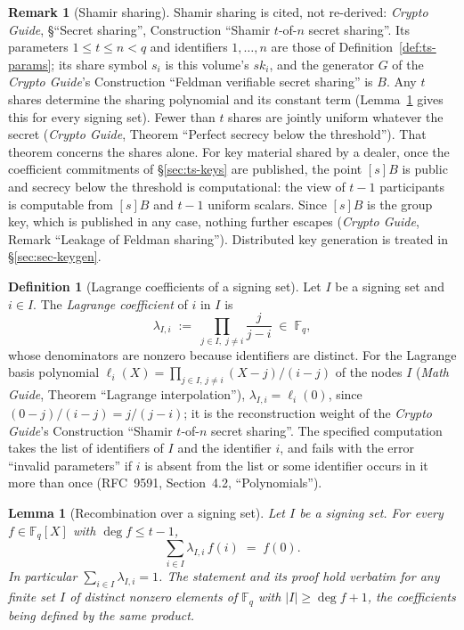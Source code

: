 \documentclass[11pt,a4paper]{article}
\newtheorem{lemma}[theorem]{Lemma}
\theoremstyle{definition}
\newtheorem{definition}[theorem]{Definition}
\newtheorem{remark}[theorem]{Remark}
\newcommand{\F}{\mathbb{F}}
\newcommand{\Fq}{\F_q}
\begin{document}
\begin{remark}[Shamir sharing]
Shamir sharing is cited, not re-derived: \emph{Crypto Guide},
\S``Secret sharing'', Construction ``Shamir \(t\)-of-\(n\) secret sharing''.
Its parameters \(1 \le t \le n < q\) and identifiers \(1, \dots, n\) are
those of Definition~\ref{def:ts-params}; its share symbol \(s_i\) is this
volume's \(\mathit{sk}_i\), and the generator \(G\) of the \emph{Crypto
Guide}'s Construction ``Feldman verifiable secret sharing'' is \(B\). Any \(t\)
shares determine the sharing polynomial and its constant term
(Lemma~\ref{lem:recombine} gives this for every signing set). Fewer than
\(t\) shares are jointly uniform whatever the secret (\emph{Crypto Guide},
Theorem ``Perfect secrecy below the threshold''). That theorem concerns the
shares alone. For key material shared by a dealer, once the coefficient
commitments of \S\ref{sec:ts-keys} are published, the point \([s]B\) is public
and secrecy below the threshold is computational: the view of \(t - 1\)
participants is computable from \([s]B\) and \(t - 1\) uniform scalars. Since
\([s]B\) is the group key, which is published in any case, nothing further
escapes (\emph{Crypto Guide}, Remark ``Leakage of Feldman sharing'').
Distributed key generation is treated in \S\ref{sec:sec-keygen}.
\end{remark}

\begin{definition}[Lagrange coefficients of a signing set]
\label{def:lagrange}
Let \(I\) be a signing set and \(i \in I\). The \emph{Lagrange coefficient}
of \(i\) in \(I\) is
\[
  \lambda_{I,i} \;:=\; \prod_{j \in I,\; j \ne i} \frac{j}{j - i}
  \;\in\; \Fq ,
\]
whose denominators are nonzero because identifiers are distinct. For the
Lagrange basis polynomial
\(\ell_i(X) = \prod_{j \in I,\, j \ne i} (X - j)/(i - j)\) of the nodes
\(I\) (\emph{Math Guide}, Theorem ``Lagrange interpolation''),
\(\lambda_{I,i} = \ell_i(0)\), since \((0 - j)/(i - j) = j/(j - i)\); it is
the reconstruction weight of the \emph{Crypto Guide}'s Construction
``Shamir \(t\)-of-\(n\) secret sharing''. The specified computation takes
the list of identifiers of \(I\) and the identifier \(i\), and fails with
the error ``invalid parameters'' if \(i\) is absent from the list or some
identifier occurs in it more than once (RFC~9591, Section~4.2,
``Polynomials'').
\end{definition}

\begin{lemma}[Recombination over a signing set]\label{lem:recombine}
Let \(I\) be a signing set. For every \(f \in \Fq[X]\) with
\(\deg f \le t - 1\),
\[
  \sum_{i \in I} \lambda_{I,i}\, f(i) \;=\; f(0) .
\]
In particular \(\sum_{i \in I} \lambda_{I,i} = 1\). The statement and its
proof hold verbatim for any finite set \(I\) of distinct nonzero elements
of \(\Fq\) with \(\lvert I \rvert \ge \deg f + 1\), the coefficients being
defined by the same product.
\end{lemma}
\end{document}

